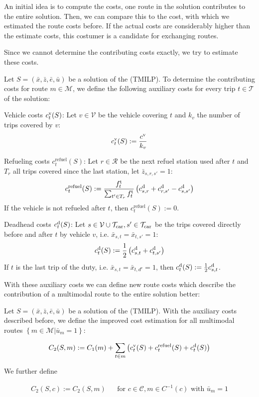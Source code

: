 An initial idea is to compute the costs, one route in the solution contributes to the entire solution. Then, we can compare this to the cost, with which we estimated the route costs before. If the actual costs are considerably higher than the estimate costs, this costumer is a candidate for exchanging routes.

Since we cannot determine the contributing costs exactly, we try to estimate these costs.

Let $S=\left(\bar{x},\bar{z},\bar{e},\bar{u}\right)$ be a solution of the (TMILP). To determine the contributing costs for route $m\in\mathcal{M}$, we define the following auxiliary costs for every trip $t\in\mathcal{T}$ of the solution:

Vehicle costs $c^{\operatorname{v}}_t(S)$: Let $v\in\mathcal{V}$ be the vehicle covering $t$ and $k_v$ the number of trips covered by $v$:
\begin{align*}
	c^{\operatorname{v}}_t(S) := \frac{c^{\operatorname{v}}}{k_v}
\end{align*}

Refueling costs $c^{\operatorname{refuel}}_t(S)$: Let $r\in\mathcal{R}$ be the next refuel station used after $t$ and $T_r$ all trips covered since the last station, let $\bar{z}_{s,r,s'} = 1$:
\begin{align*}
	c^{\operatorname{refuel}}_t(S) := \frac{f^{\operatorname{t}}_t}{\sum_{t'\in T_r} f^{\operatorname{t}}_t}\left(c^{\operatorname{d}}_{s,r}+c^{\operatorname{d}}_{r,s'}-c^{\operatorname{d}}_{s,s'}\right)
\end{align*}
If the vehicle is not refueled after $t$, then $c^{\operatorname{refuel}}_t(S) := 0$.

Deadhead costs $c^{\operatorname{d}}_t(S)$: Let $s\in\mathcal{V}\cup\mathcal{T}_{\operatorname{car}},s'\in\mathcal{T}_{\operatorname{car}}$ be the trips covered directly before and after $t$ by vehicle $v$, i.e. $\bar{x}_{s,t}=\bar{x}_{t,s'}=1$:
\begin{align*}
	c^{\operatorname{d}}_t(S) := \frac 1 2 \left(c^{\operatorname{d}}_{s,t}+c^{\operatorname{d}}_{t,s'}\right)
\end{align*}
If $t$ is the last trip of the duty, i.e. $\bar{x}_{s,t}=\bar{x}_{t,d^{\operatorname{e}}}=1$, then $c^{\operatorname{d}}_t(S) := \frac 1 2 c^{\operatorname{d}}_{s,t}$.

With these auxiliary costs we can define new route costs which describe the contribution of a multimodal route to the entire solution better:

\begin{definition}

Let $S=\left(\bar{x},\bar{z},\bar{e},\bar{u}\right)$ be a solution of the (TMILP). With the auxiliary costs described before, we define the improved cost estimation for all multimodal routes $\left\{m\in\mathcal{M}|\bar{u}_m=1\right\}$:

\begin{align*}
	C_2(S,m) := C_1(m) + \sum_{t\in m}\left(c^{\operatorname{v}}_t(S) + c^{\operatorname{refuel}}_t(S) + c^{\operatorname{d}}_t(S)\right)
\end{align*}

We further define

\begin{align*}
	C_2(S,c) := C_2(S,m) && \text{for } c\in\mathcal{C},m\in C^{-1}(c) \text{ with } \bar{u}_m = 1
\end{align*}

\end{definition}

